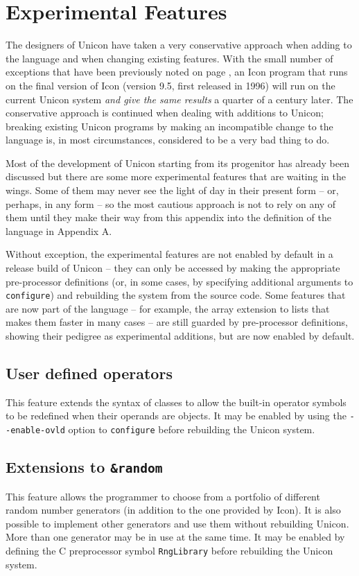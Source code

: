 \chapter{Experimental Features}

The designers of Unicon have taken a very conservative approach when adding to
the language and when changing existing features. With the small number of
exceptions that have been previously noted on page \pageref{Unicon-Icon}, an
Icon program that runs on the final version of Icon (version 9.5, first released
in 1996) will run on the current Unicon system {\em and give the same results\/}
a quarter of a century later. The conservative approach is continued when
dealing with additions to Unicon; breaking existing Unicon programs by making an
incompatible change to the language is, in most circumstances, considered to be
a very bad thing to do.

Most of the development of Unicon starting from its progenitor has already been
discussed but there are some more experimental features that are waiting in the
wings. Some of them may never see the light of day in their present form -- or,
perhaps, in any form -- so the most cautious approach is not to rely on any of
them until they make their way from this appendix into the definition of the
language in Appendix A.

Without exception, the experimental features are not enabled by default in a
release build of Unicon -- they can only be accessed by making the appropriate
pre-processor definitions (or, in some cases, by specifying additional arguments
to \texttt{configure}) and rebuilding the system from the source code. Some
features that are now part of the language -- for example, the array extension
to lists that makes them faster in many cases -- are still guarded by
pre-processor definitions, showing their pedigree as experimental additions, but
are now enabled by default.


\section{User defined operators}
This feature extends the syntax of classes to allow the built-in operator
symbols to be redefined when their operands are objects. It may be enabled by
using the \texttt{-{}-enable-ovld} option to \texttt{configure} before
rebuilding the Unicon system.

\section{Extensions to \texttt{\&random}}
This feature allows the programmer to choose from a portfolio of different
random number generators (in addition to the one provided by Icon). It is also
possible to implement other generators and use them without rebuilding Unicon.
More than one generator may be in use at the same time.
It may be enabled by defining the C preprocessor symbol \texttt{RngLibrary}
before rebuilding the Unicon system.
